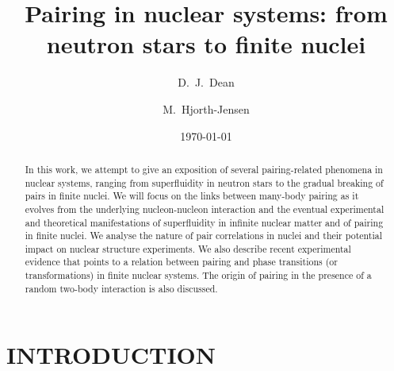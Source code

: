 \documentclass[preprint,rmp,aps,floatfix]{revtex4}
\begin{document}
\title{Pairing in nuclear systems: from neutron stars to finite nuclei}
\author{D.~J.~Dean}
\author{M.~Hjorth-Jensen}
\date{\today}
\begin{abstract}

In this work, we attempt to give an exposition of several pairing-related 
phenomena in nuclear systems, ranging from superfluidity 
in neutron stars to the gradual breaking of pairs in finite nuclei.
We will focus on the links  between
many-body pairing as it evolves from the underlying 
nucleon-nucleon interaction 
and the eventual experimental and theoretical manifestations
of superfluidity in infinite nuclear matter and 
of pairing in finite nuclei.  
We analyse
the nature of pair correlations
in nuclei and their potential impact on nuclear structure
experiments.
We  also describe recent experimental evidence that 
points to a relation between pairing and 
phase transitions (or transformations) in finite nuclear 
systems.  The origin of pairing
in the presence of a random two-body interaction is also discussed. 
\end{abstract}

\maketitle

\tableofcontents

\pagebreak

%
\section{INTRODUCTION}
\label{sec:introduction}
\end{document}
